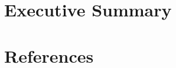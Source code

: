 \documentclass[11pt,fullpage]{article}
\begin{document}




\section{Executive Summary}





\newpage






% 
















\clearpage






\section*{References}




\appendix



\end{document}
